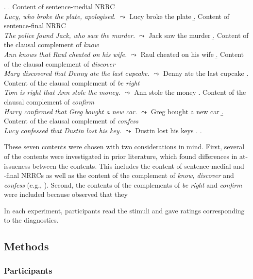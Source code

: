 \documentclass[times,linguex]{glossa}
\begin{document}
  \ex.\label{stims}
    \a.\label{stims.a} Content of sentence-medial NRRC \\
      \emph{Lucy, who broke the plate, apologised.} $\leadsto$ Lucy broke the plate
    \b.\label{stims.b} Content of sentence-final NRRC \\
    \emph{The police found Jack, who saw the murder.} $\leadsto$ Jack saw the murder
    \b.\label{stims.c} Content of the clausal complement of \emph{know} \\
    \emph{Ann knows that Raul cheated on his wife.} $\leadsto$ Raul cheated on his wife
    \b.\label{stims.d} Content of the clausal complement of \emph{discover} \\
    \emph{Mary discovered that Denny ate the last cupcake.} $\leadsto$ Denny ate the last cupcake
    \b.\label{stims.e} Content of the clausal complement of \emph{be right} \\
    \emph{Tom is right that Ann stole the money.} $\leadsto$ Ann stole the money
    \b.\label{stims.f} Content of the clausal complement of \emph{confirm} \\
    \emph{Harry confirmed that Greg bought a new car.} $\leadsto$ Greg bought a new car
    \b.\label{stims.g} Content of the clausal complement of \emph{confess}  \\
    \emph{Lucy confessed that Dustin lost his key.} $\leadsto$ Dustin lost his keys
    \z.
  \z.
  
These seven contents were chosen with two considerations in mind. First, several of the contents were investigated in prior literature, which found differences in at-issueness between the contents. This includes the content of sentence-medial and -final NRRCs as well as the content of the complement of \emph{know, discover} and \emph{confess} (e.g., \citealt{syrett_experimental_2015,tonhauser_how_2018}). Second, the contents of the complements of \emph{be right} and \emph{confirm} were included because \citealt{degen-tonhauser-glossa} observed that they 



  In each experiment, participants read the stimuli and gave ratings corresponding to the diagnostics.

  \subsection{Methods}
    
  \subsubsection{Participants}
\end{document}
